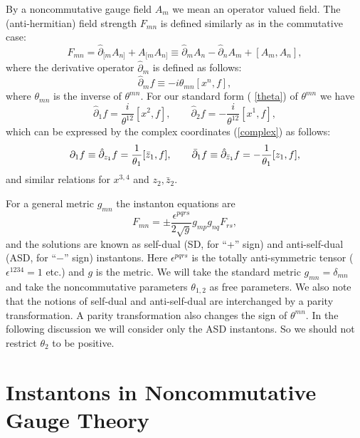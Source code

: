 \documentclass[a4paper,a4paper]{article}
\begin{document}
By a noncommutative gauge field $A_m$ we mean an operator valued field. The
(anti-hermitian) field strength $F_{mn}$ is defined similarly as in the
commutative case:
\begin{equation}
F_{mn}=\hat\partial_{[m} A_{n]} + A_{[m} A_{n]} \equiv \hat\partial_m A_n -
\hat\partial_n A_m + [A_m, A_n],  \label{F by A}
\end{equation}
where the derivative operator $\hat\partial_m$ is defined as follows:
\begin{equation}
\hat\partial_m f \equiv - i \theta_{mn} [x^n, f],
\end{equation}
where $\theta_{mn}$ is the inverse of $\theta^{mn}$. For our standard form (%
\ref{theta}) of $\theta^{mn}$ we have
\begin{equation}
\hat\partial_1 f = {\frac{i }{\theta^{12}}} [x^2,f], \qquad \hat\partial_2 f
= - {\frac{i }{\theta^{12}}} [x^1,f],
\end{equation}
which can be expressed by the complex coordinates (\ref{complex}) as
follows:
\begin{equation}
\partial_1 f \equiv \hat\partial_{z_1}f = {\frac{1}{\theta_1}}[\bar z_1, f],
\qquad \bar\partial_1 f \equiv \hat\partial_{\bar z_1}f = - {\frac{1}{%
\theta_1}}[z_1, f],
\end{equation}
and similar relations for $x^{3,4}$ and $z_2,\bar{z}_2$.

For a general metric $g_{mn}$ the instanton equations are
\begin{equation}  \label{instanton}
F_{mn}=\pm\frac{\epsilon^{pqrs}}{2\sqrt{g}}g_{mp}g_{nq}F_{rs},
\end{equation}
and the solutions are known as self-dual (SD, for ``+'' sign) and
anti-self-dual (ASD, for ``$-$'' sign) instantons. Here $\epsilon^{pqrs}$ is
the totally anti-symmetric tensor ($\epsilon^{1234}=1$ etc.) and $g$ is the
metric. We will take the standard metric $g_{mn}=\delta_{mn}$ and take the
noncommutative parameters $\theta_{1,2}$ as free parameters. We also note
that the notions of self-dual and anti-self-dual are interchanged by a
parity transformation. A parity transformation also changes the sign of $%
\theta^{mn}$. In the following discussion we will consider only the ASD
instantons. So we should not restrict $\theta_2$ to be positive.

\section{Instantons in Noncommutative Gauge Theory}
\end{document}
